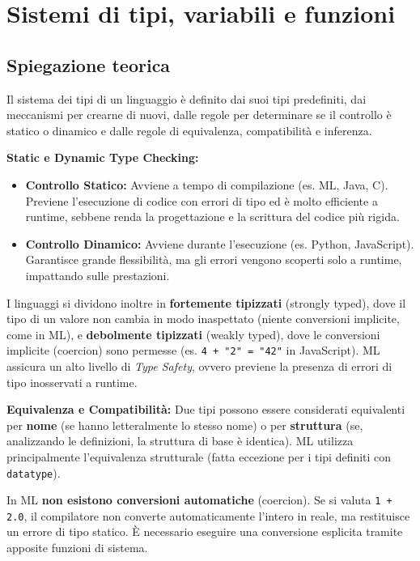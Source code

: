\documentclass[12pt, a4paper]{article}
\begin{document}
\section{Sistemi di tipi, variabili e funzioni}

\subsection{Spiegazione teorica}
Il sistema dei tipi di un linguaggio è definito dai suoi tipi predefiniti, dai meccanismi per crearne di nuovi, dalle regole per determinare se il controllo è statico o dinamico e dalle regole di equivalenza, compatibilità e inferenza.

\textbf{Static e Dynamic Type Checking:}
\begin{itemize}
    \item \textbf{Controllo Statico:} Avviene a tempo di compilazione (es. ML, Java, C). Previene l'esecuzione di codice con errori di tipo ed è molto efficiente a runtime, sebbene renda la progettazione e la scrittura del codice più rigida.
    \item \textbf{Controllo Dinamico:} Avviene durante l'esecuzione (es. Python, JavaScript). Garantisce grande flessibilità, ma gli errori vengono scoperti solo a runtime, impattando sulle prestazioni.
\end{itemize}

I linguaggi si dividono inoltre in \textbf{fortemente tipizzati} (strongly typed), dove il tipo di un valore non cambia in modo inaspettato (niente conversioni implicite, come in ML), e \textbf{debolmente tipizzati} (weakly typed), dove le conversioni implicite (coercion) sono permesse (es. \texttt{4 + "2" = "42"} in JavaScript). ML assicura un alto livello di \textit{Type Safety}, ovvero previene la presenza di errori di tipo inosservati a runtime.

\textbf{Equivalenza e Compatibilità:}
Due tipi possono essere considerati equivalenti per \textbf{nome} (se hanno letteralmente lo stesso nome) o per \textbf{struttura} (se, analizzando le definizioni, la struttura di base è identica). ML utilizza principalmente l'equivalenza strutturale (fatta eccezione per i tipi definiti con \texttt{datatype}).

In ML \textbf{non esistono conversioni automatiche} (coercion). Se si valuta \texttt{1 + 2.0}, il compilatore non converte automaticamente l'intero in reale, ma restituisce un errore di tipo statico. È necessario eseguire una conversione esplicita tramite apposite funzioni di sistema.
\end{document}
